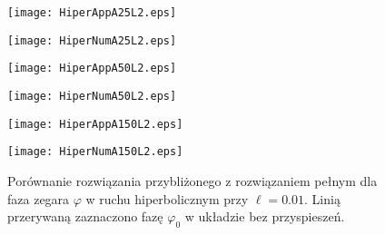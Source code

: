 \begin{figure}
\begin{minipage}[b]{.5\linewidth}
\centering
\texttt{[image: HiperAppA25L2.eps]}
\label{fig:2a1}
\end{minipage}%
\begin{minipage}[b]{.5\linewidth}
\centering
\texttt{[image: HiperNumA25L2.eps]}
\label{fig:2n1}
\end{minipage}
\begin{minipage}[b]{.5\linewidth}
\centering
\texttt{[image: HiperAppA50L2.eps]}
\label{fig:2a2}
\end{minipage}%
\begin{minipage}[b]{.5\linewidth}
\centering
\texttt{[image: HiperNumA50L2.eps]}
\label{fig:2n2}
\end{minipage}
\begin{minipage}[b]{.5\linewidth}
\centering
\texttt{[image: HiperAppA150L2.eps]}
\label{fig:2a3}
\end{minipage}%
\begin{minipage}[b]{.5\linewidth}
\centering
\texttt{[image: HiperNumA150L2.eps]}
\label{fig:2n3}
\end{minipage}
\caption{Porównanie rozwiązania przybliżonego z rozwiązaniem pełnym
dla faza zegara $\varphi$ w ruchu hiperbolicznym przy
$\ell=0.01$. Linią przerywaną zaznaczono fazę 
$\varphi_0$ w układzie bez przyspieszeń. }\label{fig:2}
\end{figure}


